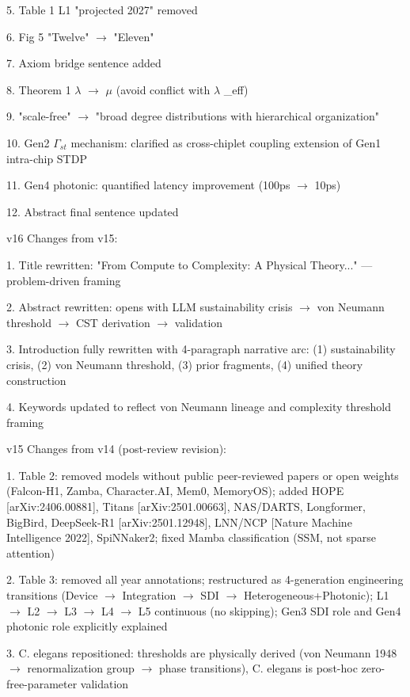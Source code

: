 \documentclass[a4paper,12pt]{article}
\begin{document}
5. Table 1 L1 "projected 2027" removed

6. Fig 5 "Twelve"  $\rightarrow$  "Eleven"

7. Axiom bridge sentence added

8. Theorem 1  $\lambda$   $\rightarrow$   $\mu$  (avoid conflict with  $\lambda$ \_eff)

9. "scale-free"  $\rightarrow$  "broad degree distributions with hierarchical organization"

10. Gen2 $\Gamma_{st}$ mechanism: clarified as cross-chiplet coupling extension of Gen1 intra-chip STDP

11. Gen4 photonic: quantified latency improvement (100ps $\rightarrow$ 10ps)

12. Abstract final sentence updated

v16 Changes from v15:

1. Title rewritten: "From Compute to Complexity: A Physical Theory..." --- problem-driven framing

2. Abstract rewritten: opens with LLM sustainability crisis  $\rightarrow$  von Neumann threshold  $\rightarrow$  CST derivation  $\rightarrow$  validation

3. Introduction fully rewritten with 4-paragraph narrative arc: (1) sustainability crisis, (2) von Neumann threshold, (3) prior fragments, (4) unified theory construction

4. Keywords updated to reflect von Neumann lineage and complexity threshold framing

v15 Changes from v14 (post-review revision):

1. Table 2: removed models without public peer-reviewed papers or open weights (Falcon-H1, Zamba, Character.AI, Mem0, MemoryOS); added HOPE [arXiv:2406.00881], Titans [arXiv:2501.00663], NAS/DARTS, Longformer, BigBird, DeepSeek-R1 [arXiv:2501.12948], LNN/NCP [Nature Machine Intelligence 2022], SpiNNaker2; fixed Mamba classification (SSM, not sparse attention)

2. Table 3: removed all year annotations; restructured as 4-generation engineering transitions (Device $\rightarrow$ Integration $\rightarrow$ SDI $\rightarrow$ Heterogeneous+Photonic); L1 $\rightarrow$ L2 $\rightarrow$ L3 $\rightarrow$ L4 $\rightarrow$ L5 continuous (no skipping); Gen3 SDI role and Gen4 photonic role explicitly explained

3. C. elegans repositioned: thresholds are physically derived (von Neumann 1948  $\rightarrow$  renormalization group  $\rightarrow$  phase transitions), C. elegans is post-hoc zero-free-parameter validation
\end{document}
